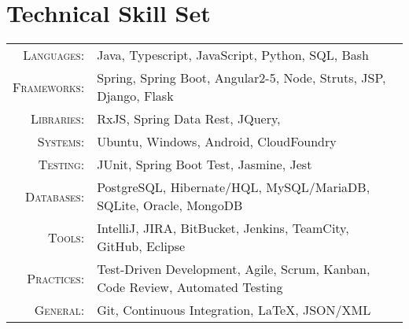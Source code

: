 \section{Technical Skill Set}

\begin{tabular}{r|p{11cm}}
	\textsc{Languages}: & Java, Typescript, JavaScript, Python, SQL, Bash \\
	\textsc{Frameworks}: & Spring, Spring Boot, Angular2-5, Node, Struts, JSP, Django, Flask \\
	\textsc{Libraries}: & RxJS, Spring Data Rest, JQuery,  \\
	\textsc{Systems}: & Ubuntu, Windows, Android, CloudFoundry \\
	\textsc{Testing}: & JUnit, Spring Boot Test, Jasmine, Jest \\
	\textsc{Databases}: & PostgreSQL, Hibernate/HQL, MySQL/MariaDB, SQLite, Oracle, MongoDB \\
	\textsc{Tools}: & IntelliJ, JIRA, BitBucket, Jenkins, TeamCity, GitHub, Eclipse \\
	\textsc{Practices}: & Test-Driven Development, Agile, Scrum, Kanban, Code Review, Automated Testing \\
	\textsc{General}: & Git, Continuous Integration, LaTeX, JSON/XML  \\
\end{tabular}
